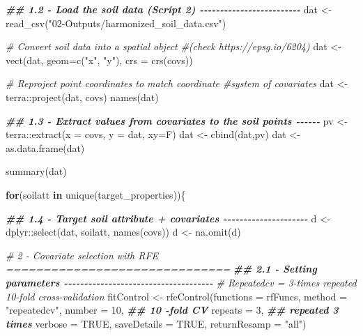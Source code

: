 \documentclass[
  10pt,
  b5paper,
  oneside]{book}
\newenvironment{Shaded}{\begin{snugshade}}{\end{snugshade}}
\newcommand{\AttributeTok}[1]{\textcolor[rgb]{0.77,0.63,0.00}{#1}}
\newcommand{\CommentTok}[1]{\textcolor[rgb]{0.56,0.35,0.01}{\textit{#1}}}
\newcommand{\ConstantTok}[1]{\textcolor[rgb]{0.00,0.00,0.00}{#1}}
\newcommand{\ControlFlowTok}[1]{\textcolor[rgb]{0.13,0.29,0.53}{\textbf{#1}}}
\newcommand{\DecValTok}[1]{\textcolor[rgb]{0.00,0.00,0.81}{#1}}
\newcommand{\DocumentationTok}[1]{\textcolor[rgb]{0.56,0.35,0.01}{\textbf{\textit{#1}}}}
\newcommand{\FunctionTok}[1]{\textcolor[rgb]{0.00,0.00,0.00}{#1}}
\newcommand{\NormalTok}[1]{#1}
\newcommand{\OtherTok}[1]{\textcolor[rgb]{0.56,0.35,0.01}{#1}}
\newcommand{\SpecialCharTok}[1]{\textcolor[rgb]{0.00,0.00,0.00}{#1}}
\newcommand{\StringTok}[1]{\textcolor[rgb]{0.31,0.60,0.02}{#1}}
\begin{document}
\begin{Shaded}
\begin{Highlighting}[]
\DocumentationTok{\#\# 1.2 {-} Load the soil data (Script 2) {-}{-}{-}{-}{-}{-}{-}{-}{-}{-}{-}{-}{-}{-}{-}{-}{-}{-}{-}{-}{-}{-}{-}{-}{-}}
\NormalTok{dat }\OtherTok{\textless{}{-}} \FunctionTok{read\_csv}\NormalTok{(}\StringTok{"02{-}Outputs/harmonized\_soil\_data.csv"}\NormalTok{)}

\CommentTok{\# Convert soil data into a spatial object }
\CommentTok{\#(check https://epsg.io/6204)}
\NormalTok{dat }\OtherTok{\textless{}{-}} \FunctionTok{vect}\NormalTok{(dat, }\AttributeTok{geom=}\FunctionTok{c}\NormalTok{(}\StringTok{"x"}\NormalTok{, }\StringTok{"y"}\NormalTok{), }\AttributeTok{crs =} \FunctionTok{crs}\NormalTok{(covs))}

\CommentTok{\# Reproject point coordinates to match coordinate }
\CommentTok{\#system of covariates}
\NormalTok{dat }\OtherTok{\textless{}{-}}\NormalTok{ terra}\SpecialCharTok{::}\FunctionTok{project}\NormalTok{(dat, covs)}
\FunctionTok{names}\NormalTok{(dat)}

\DocumentationTok{\#\# 1.3 {-} Extract values from covariates to the soil points {-}{-}{-}{-}{-}{-}}
\NormalTok{pv }\OtherTok{\textless{}{-}}\NormalTok{ terra}\SpecialCharTok{::}\FunctionTok{extract}\NormalTok{(}\AttributeTok{x =}\NormalTok{ covs, }\AttributeTok{y =}\NormalTok{ dat, }\AttributeTok{xy=}\NormalTok{F)}
\NormalTok{dat }\OtherTok{\textless{}{-}} \FunctionTok{cbind}\NormalTok{(dat,pv)}
\NormalTok{dat }\OtherTok{\textless{}{-}} \FunctionTok{as.data.frame}\NormalTok{(dat)}

\FunctionTok{summary}\NormalTok{(dat)}



\ControlFlowTok{for}\NormalTok{(soilatt }\ControlFlowTok{in} \FunctionTok{unique}\NormalTok{(target\_properties))\{}


\DocumentationTok{\#\# 1.4 {-} Target soil attribute + covariates {-}{-}{-}{-}{-}{-}{-}{-}{-}{-}{-}{-}{-}{-}{-}{-}{-}{-}{-}{-}{-}}
\NormalTok{d }\OtherTok{\textless{}{-}}\NormalTok{ dplyr}\SpecialCharTok{::}\FunctionTok{select}\NormalTok{(dat, soilatt, }\FunctionTok{names}\NormalTok{(covs))}
\NormalTok{d }\OtherTok{\textless{}{-}} \FunctionTok{na.omit}\NormalTok{(d)}

\CommentTok{\# 2 {-} Covariate selection with RFE ==============================}
\DocumentationTok{\#\# 2.1 {-} Setting parameters {-}{-}{-}{-}{-}{-}{-}{-}{-}{-}{-}{-}{-}{-}{-}{-}{-}{-}{-}{-}{-}{-}{-}{-}{-}{-}{-}{-}{-}{-}{-}{-}{-}{-}{-}{-}{-}}
\CommentTok{\# Repeatedcv = 3{-}times repeated 10{-}fold cross{-}validation}
\NormalTok{fitControl }\OtherTok{\textless{}{-}} \FunctionTok{rfeControl}\NormalTok{(}\AttributeTok{functions =}\NormalTok{ rfFuncs,}
                         \AttributeTok{method =} \StringTok{"repeatedcv"}\NormalTok{,}
                         \AttributeTok{number =} \DecValTok{10}\NormalTok{,         }\DocumentationTok{\#\# 10 {-}fold CV}
                         \AttributeTok{repeats =} \DecValTok{3}\NormalTok{,        }\DocumentationTok{\#\# repeated 3 times}
                         \AttributeTok{verbose =} \ConstantTok{TRUE}\NormalTok{,}
                         \AttributeTok{saveDetails =} \ConstantTok{TRUE}\NormalTok{, }
                         \AttributeTok{returnResamp =} \StringTok{"all"}\NormalTok{)}


\end{Highlighting}
\end{Shaded}
\end{document}
